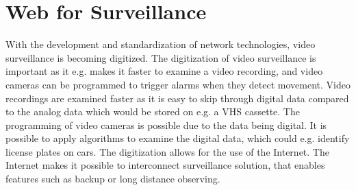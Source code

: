 \section{Web for Surveillance}
With the development and standardization of network technologies, video surveillance is becoming digitized.
The digitization of video surveillance is important as it e.g. makes it faster to examine a video recording, and video cameras can be programmed to trigger alarms when they detect movement.
Video recordings are examined faster as it is easy to skip through digital data compared to the analog data which would be stored on e.g. a VHS cassette.
The programming of video cameras is possible due to the data being digital. 
It is possible to apply algorithms to examine the digital data, which could e.g. identify license plates on cars.
The digitization allows for the use of the Internet.
The Internet makes it possible to interconnect surveillance solution, that enables features such as backup or long distance observing.